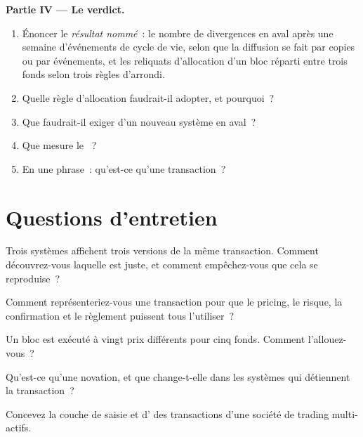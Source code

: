 \begin{problem}
\medskip\noindent\textbf{Partie IV --- Le verdict.}
\begin{enumerate}[resume]
\item Énoncer le \emph{résultat nommé}~: le nombre de divergences en aval après une semaine d'événements de cycle de vie, selon que la diffusion se fait par copies
ou par événements, et les reliquats d'allocation d'un bloc réparti entre trois fonds selon trois règles d'arrondi.
\item Quelle règle d'allocation faudrait-il adopter, et pourquoi~?
\item Que faudrait-il exiger d'un nouveau système en aval~?
\item Que mesure le ~?
\item En une phrase~: qu'est-ce qu'une transaction~?
\end{enumerate}
\end{problem}

\section{Questions d'entretien}

\begin{interviewq}\label{iq:pl:trade-capture-and-booking:1}
Trois systèmes affichent trois versions de la même transaction. Comment découvrez-vous laquelle est juste, et comment empêchez-vous que cela se reproduise~?
\end{interviewq}

\begin{interviewq}\label{iq:pl:trade-capture-and-booking:2}
Comment représenteriez-vous une transaction pour que le pricing, le risque, la confirmation et le règlement puissent tous l'utiliser~?
\end{interviewq}

\begin{interviewq}\label{iq:pl:trade-capture-and-booking:3}
Un bloc est exécuté à vingt prix différents pour cinq fonds. Comment l'allouez-vous~?
\end{interviewq}

\begin{interviewq}\label{iq:pl:trade-capture-and-booking:4}
Qu'est-ce qu'une novation, et que change-t-elle dans les systèmes qui détiennent la transaction~?
\end{interviewq}

\begin{interviewq}\label{iq:pl:trade-capture-and-booking:5}
Concevez la couche de saisie et d' des transactions d'une société de trading multi-actifs.
\end{interviewq}
